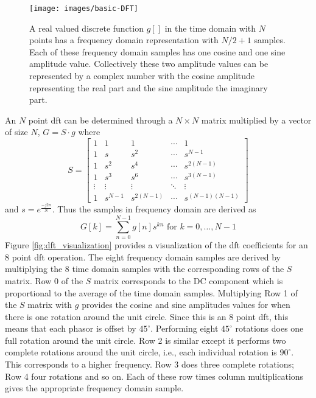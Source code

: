 \begin{figure}
\centering
\texttt{[image: images/basic-DFT]}
\caption{ A real valued discrete function $g[ ]$ in the time domain with $N$ points has a frequency domain representation with $N/2 + 1$ samples. Each of these frequency domain samples has one cosine and one sine amplitude value. Collectively these two amplitude values can be represented by a complex number with the cosine amplitude representing the real part and the sine amplitude the imaginary part. }
\label{fig:basic-DFT}
\end{figure}



An $N$ point \gls{dft} can be determined through a $N \times N$ matrix multiplied by a vector of size $N$, $G = S \cdot g$ where
\begin{equation}
S =
 \begin{bmatrix}
 \label{eq:Smatrix}
  1 & 1 & 1 & \cdots & 1 \\
  1 & s & s^2 & \cdots & s^{N-1} \\
  1 & s^2 & s^4 & \cdots & s^{2(N-1)} \\
  1 & s^3 & s^6 & \cdots & s^{3(N-1)} \\
  \vdots  & \vdots  & \vdots &\ddots & \vdots  \\
  1 & s^{N-1} & s^{2(N-1)}&\cdots & s^{(N-1)(N-1)}
 \end{bmatrix}
\end{equation} and $s = e^{\frac{-j 2 \pi}{N}}$.   Thus the samples in frequency domain are derived as 
\begin{equation}
G[k] = \displaystyle\sum\limits_{n=0}^{N-1} g[n] s^{kn} \text{ for } k = 0,\dots, N-1
\end{equation}
Figure \ref{fig:dft_visualization} provides a visualization of the \gls{dft} coefficients for an 8 point \gls{dft} operation. The eight frequency domain samples are derived by multiplying the 8 time domain samples with the corresponding rows of the $S$ matrix. Row 0 of the $S$ matrix corresponds to the DC component which is proportional to the average of the time domain samples. Multiplying Row 1 of the $S$ matrix with $g$ provides the cosine and sine amplitudes values for when there is one rotation around the unit circle. Since this is an 8 point \gls{dft}, this means that each phasor is offset by $45^{\circ}$. Performing eight $45^{\circ}$ rotations does one full rotation around the unit circle. Row 2 is similar except it performs two complete rotations around the unit circle, i.e., each individual rotation is $90^{\circ}$. This corresponds to a higher frequency. Row 3 does three complete rotations; Row 4 four rotations and so on. Each of these row times column multiplications gives the appropriate frequency domain sample. 

